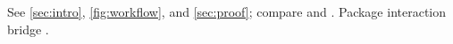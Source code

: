 \documentclass[twocolumn,unicode,paperfamily]{wrapper}
\begin{document}
\tableofcontents
\listoffigures
\wrapperclass\articleclass\layoutmode\hyperdriver\hyperxmploaded\shimready


See \cref{sec:intro}, \autoref{fig:workflow}, and \autoref{sec:proof}; compare \citeauthor{alpha} \citeyearpar{alpha} and \citep[see][pp.~1--2]{beta}.
Package interaction bridge \PackageInteractionLayer.
\end{document}
